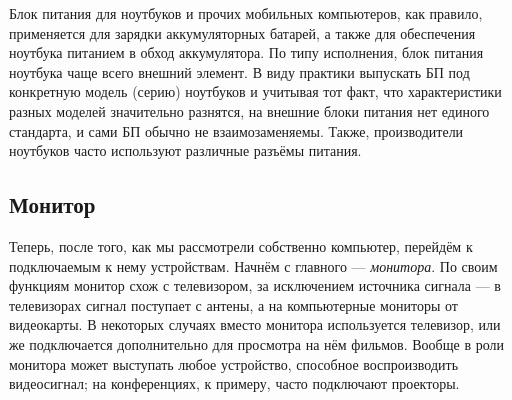 Блок питания для ноутбуков и прочих мобильных компьютеров, как правило, применяется для зарядки аккумуляторных батарей, а также для обеспечения ноутбука питанием в обход аккумулятора.
По типу исполнения, блок питания ноутбука чаще всего внешний элемент.
В виду практики выпускать БП под конкретную модель (серию) ноутбуков и учитывая тот факт, что характеристики разных моделей значительно разнятся, на внешние блоки питания нет единого стандарта, и сами БП обычно не взаимозаменяемы.
Также, производители ноутбуков часто используют различные разъёмы питания.

\subsection{Монитор}\label{base:introduction:components:monitor}
Теперь, после того, как мы рассмотрели собственно компьютер, перейдём к подключаемым к нему устройствам.
Начнём с главного --- \emph{монитора}.
По своим функциям монитор схож с телевизором, за исключением источника сигнала --- в телевизорах сигнал поступает с антены, а на компьютерные мониторы от видеокарты.
В некоторых случаях вместо монитора используется телевизор, или же подключается дополнительно для просмотра на нём фильмов.
Вообще в роли монитора может выступать любое устройство, способное воспроизводить видеосигнал; на конференциях, к примеру, часто подключают проекторы.

